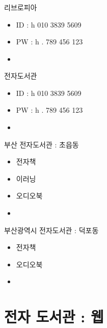 \documentclass[aspectratio=1610,17pt,xcolor=pdftex,dvipsnames,table,handout]{beamer}
\begin{document}
		\begin{frame} [t,plain]
		\frametitle{}


			\begin{block} {리브로피아}
			\setlength{\leftmargini}{4em}			
			\begin{itemize}
				\item ID : h 010 3839 5609
				\item PW : h . 789 456 123
				\item 
			\end{itemize}
			\end{block}						


			\begin{block} {전자도서관}
			\setlength{\leftmargini}{4em}			
			\begin{itemize}
				\item ID : h 010 3839 5609
				\item PW : h . 789 456 123
				\item 
			\end{itemize}
			\end{block}						

			\begin{block} {부산 전자도서관 : 초읍동}
			\setlength{\leftmargini}{4em}			
			\begin{itemize}
				\item 전자책
				\item 이러닝
				\item 오디오북
				\item 
			\end{itemize}
			\end{block}						

			\begin{block} {부산광역시 전자도서관 : 덕포동}
			\setlength{\leftmargini}{4em}			
			\begin{itemize}
				\item 전자책
				\item 오디오북
				\item 
			\end{itemize}
			\end{block}						

		\end{frame}						


		\section 	{전자 도서관 : 웹}
\end{document}

